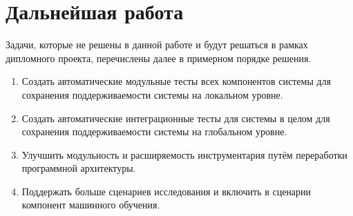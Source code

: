 \section{Дальнейшая работа}
Задачи, которые не решены в данной работе и будут решаться в рамках дипломного проекта, перечислены далее в примерном порядке решения.
\begin{enumerate}
    \item Создать автоматические модульные тесты всех компонентов системы для сохранения поддерживаемости системы на локальном уровне.
    \item Создать автоматические интеграционные тесты для системы в целом для сохранения поддерживаемости системы на глобальном уровне.
    \item Улучшить модульность и расширяемость инструментария путём переработки программной архитектуры.
    \item Поддержать больше сценариев исследования и включить в сценарии компонент машинного обучения.
\end{enumerate}